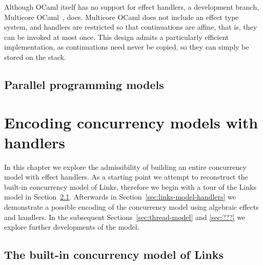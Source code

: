 \documentclass[12pt,mscres,cdtppar,twoside,openright,logo,rightchapter,normalheadings]{infthesis}
\theoremstyle{definition}
\newcommand{\todo}[1]{{\par\noindent\small\color{red} \framebox{\parbox{\dimexpr\linewidth-2\fboxsep-2\fboxrule}{\textbf{TODO:} #1}}}}
\begin{document}
Although OCaml itself has no support for effect handlers, a
development branch, Multicore OCaml~\cite{Dolan2015}, does. Multicore
OCaml does not include an effect type system, and handlers are
restricted so that continuations are affine, that is, they can be
invoked at most once. This design admits a particularly efficient
implementation, as continuations need never be copied, so they can
simply be stored on the stack.

\section{Parallel programming models}
\todo{\cite{Marlow2013}}

\chapter{Encoding concurrency models with handlers}
\label{ch:programming}

In this chapter we explore the admissibility of building an entire
concurrency model with effect handlers. As a starting point we attempt
to reconstruct the built-in concurrency model of Links, therefore we
begin with a tour of the Links model in
Section~\ref{sec:links-model}. Afterwards in
Section~\ref{sec:links-model-handlers} we demonstrate a possible
encoding of the concurrency model using algebraic effects and
handlers. In the subsequent Sections~\ref{sec:thread-model} and
\ref{sec:???} we explore further developments of the model.

\section{The built-in concurrency model of Links}
\label{sec:links-model}
\end{document}

